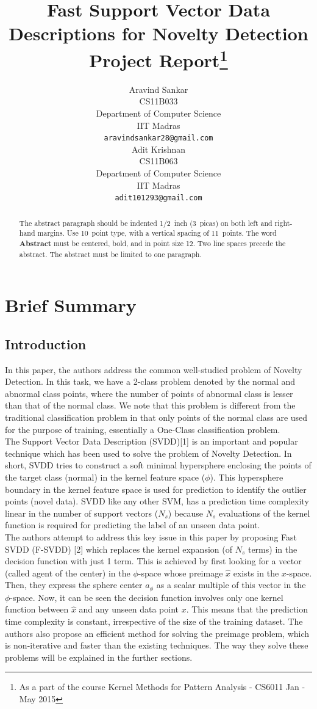 \documentclass{article} %
\title{Fast Support Vector Data Descriptions for Novelty Detection\\ Project Report\thanks{As a part of the course Kernel Methods for Pattern Analysis - CS6011 Jan - May 2015}}
\author{
Aravind Sankar \\
CS11B033 \\
Department of Computer Science\\
IIT Madras\\
\texttt{aravindsankar28@gmail.com} \\
\And
Adit Krishnan \\
CS11B063\\
Department of Computer Science\\
IIT Madras\\
\texttt{adit101293@gmail.com} \\
}
\begin{document}
\maketitle

\begin{abstract}
The abstract paragraph should be indented 1/2~inch (3~picas) on both left and
right-hand margins. Use 10~point type, with a vertical spacing of 11~points.
The word \textbf{Abstract} must be centered, bold, and in point size 12. Two
line spaces precede the abstract. The abstract must be limited to one
paragraph.
\end{abstract}




\section{Brief Summary}
\subsection{Introduction}

In this paper, the authors address the common well-studied problem of Novelty Detection. In this task, we have a 2-class problem denoted by the normal and abnormal class points, where the number of points of abnormal class is lesser than that of the normal class. We note that this problem is different from the traditional classification problem in that only points of the normal class are used for the purpose of training, essentially a One-Class classification problem.  \\[10pt]

The Support Vector Data Description (SVDD)[1]  is an important and popular technique which has been used to solve the problem of Novelty Detection. In short, SVDD tries to construct a soft minimal hypersphere enclosing the points of the target class (normal) in the kernel feature space ($\phi$). This hypersphere boundary in the kernel feature space is used for prediction to identify the outlier points (novel data). SVDD like any other SVM, has a prediction time complexity linear in the number of support vectors ($N_s$) because $N_s$ evaluations of the kernel function is required for predicting the label of an unseen data point. \\[10pt]

The authors attempt to address this key issue in this paper by proposing Fast SVDD (F-SVDD) [2] which replaces the kernel expansion (of $N_s$ terms) in the decision function with just 1 term. This is achieved by first looking for a vector (called agent of the center) in the $\phi$-space whose preimage $\hat{x}$ exists in the $x$-space. Then, they express the sphere center $a_{\phi}$ as a scalar multiple of this vector in the $\phi$-space. Now, it can be seen the decision function involves only one kernel function between $\hat{x}$ and any unseen data point $x$. This means that the prediction time complexity is constant, irrespective of the size of the training dataset. The authors also propose an efficient method for solving the preimage problem, which is non-iterative and faster than the existing techniques. The way they solve these problems will be explained in the further sections.
\end{document}
